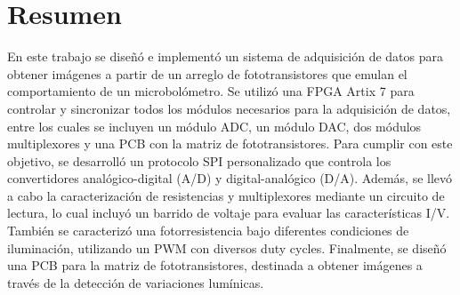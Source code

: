 \chapter{Resumen}

En este trabajo se diseñó e implementó un sistema de adquisición de datos para obtener imágenes a partir de un arreglo de fototransistores que emulan el comportamiento de un microbolómetro. Se utilizó una FPGA Artix 7 para controlar y sincronizar todos los módulos necesarios para la adquisición de datos, entre los cuales se incluyen un módulo ADC, un módulo DAC, dos módulos multiplexores y una PCB con la matriz de fototransistores. Para cumplir con este objetivo, se desarrolló un protocolo SPI personalizado que controla los convertidores analógico-digital (A/D) y digital-analógico (D/A). Además, se llevó a cabo la caracterización de resistencias y multiplexores mediante un circuito de lectura, lo cual incluyó un barrido de voltaje para evaluar las características I/V. También se caracterizó una fotorresistencia bajo diferentes condiciones de iluminación, utilizando un PWM con diversos duty cycles. Finalmente, se diseñó una PCB para la matriz de fototransistores, destinada a obtener imágenes a través de la detección de variaciones lumínicas.